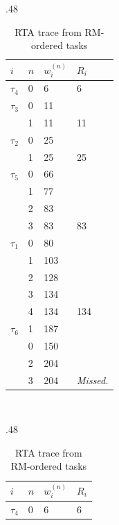 \documentclass{article}
\numberwithin{equation}{section}
\numberwithin{table}{section}
\numberwithin{figure}{section}
\begin{document}
\begin{enumerate}
        \begin{table}[p]
            \centering%
            \begin{subtable}{.48\linewidth}
                \centering%
                \begin{tabular}{ll|ll}
                    $i$ & $n$ & $w_i^{(n)}$ & $R_i$ \\
                    \toprule
                    $\tau_4$ & 0 & 6 & 6 \\
                    \midrule
                    $\tau_3$ & 0 & 11 \\
                    & 1 & 11 & 11 \\
                    \midrule
                    $\tau_2$ & 0 & 25 \\
                    & 1 & 25 & 25 \\
                    \midrule
                    $\tau_5$ & 0 & 66 \\
                    & 1 & 77 \\
                    & 2 & 83 \\
                    & 3 & 83 & 83 \\
                    \midrule
                    $\tau_1$ & 0 & 80 \\
                    & 1 & 103 \\
                    & 2 & 128 \\
                    & 3 & 134 \\
                    & 4 & 134 & 134 \\
                    \midrule
                    $\tau_6$ & 1 & 187 \\
                    & 0 & 150 \\
                    & 2 & 204 \\
                    & 3 & 204 & \emph{Missed.} \\
                    \bottomrule
                \end{tabular}
                \caption{RTA trace from RM-ordered tasks}%
                \label{table:rm-response-times-trace}
            \end{subtable}~%
            \begin{subtable}{.48\linewidth}
                \centering%
                \begin{tabular}{ll|ll}
                    $i$ & $n$ & $w_i^{(n)}$ & $R_i$ \\
                    \toprule
                    $\tau_4$ & 0 & 6 & 6 \\

\end{tabular}
\end{subtable}
\end{table}
\end{enumerate}
\end{document}
